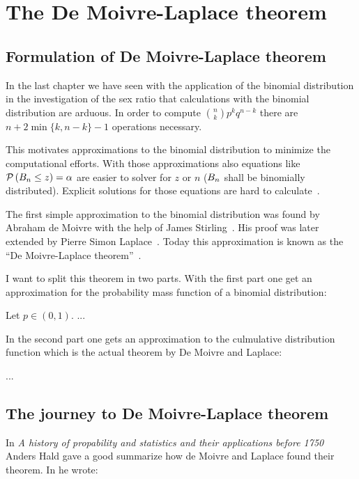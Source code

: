 \chapter{The De Moivre-Laplace theorem}

\section{Formulation of De Moivre-Laplace theorem}

In the last chapter we have seen with the application of the binomial distribution in the investigation of the sex ratio that calculations with the binomial distribution are arduous. In order to compute $\binom nk p^kq^{n-k}$ there are $n+2\min\{k,n-k\}-1$ operations necessary.

This motivates approximations to the binomial distribution to minimize the computational efforts. With those approximations also equations like $\mathcal P\left({B_{n} \le z}\right)=\alpha$ are easier to solver for $z$ or $n$ ($B_{n}$ shall be binomially distributed). Explicit solutions for those equations are hard to calculate~\cite[p. 469]{hald1}.

The first simple approximation to the binomial distribution was found by Abraham de Moivre with the help of James Stirling~\cite[p. 469]{hald1}. His proof was later extended by Pierre Simon Laplace~\cite[pp. 495 ff.]{hald1}. Today this approximation is known as the ``De Moivre-Laplace theorem''~\cite[pp. 64-67]{irle}. 

I want to split this theorem in two parts. With the first part one get an approximation for the probability mass function of a binomial distribution:

\begin{theorem}
  Let $p\in(0,1)$. ...
\end{theorem}

In the second part one gets an approximation to the culmulative distribution function which is the actual theorem by De Moivre and Laplace:

\begin{theorem}
  ...
\end{theorem}

\section{The journey to De Moivre-Laplace theorem}

In \emph{A history of propability and statistics and their applications before 1750} Anders Hald gave a good summarize how de Moivre and Laplace found their theorem. In \cite[pp. 469-470]{hald1} he wrote:

